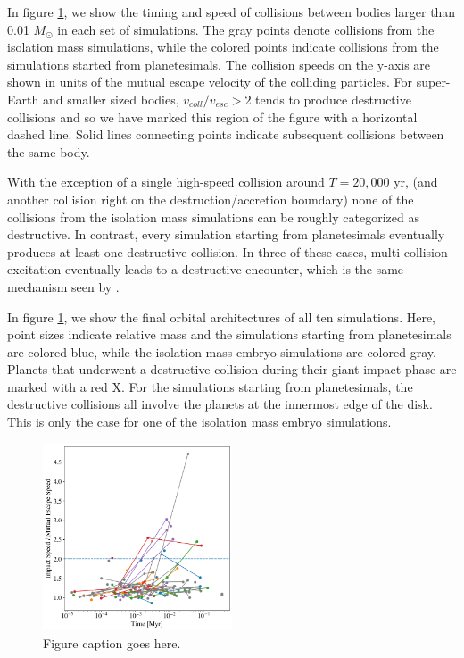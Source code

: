 In figure \ref{fig:impact_iso_comp}, we show the timing and speed of collisions between bodies larger than 0.01 $M_{\odot}$ in each set of simulations. The gray points denote collisions from the isolation mass simulations, while the colored points indicate collisions from the simulations started from planetesimals. The collision speeds on the y-axis are shown in units of the mutual escape velocity of the colliding particles. For super-Earth and smaller sized bodies, $v_{coll}/v_{esc} > 2$ tends to produce destructive collisions \cite{marcus09} and so we have marked this region of the figure with a horizontal dashed line. Solid lines connecting points indicate subsequent collisions between the same body.

With the exception of a single high-speed collision around $T = 20,000$ yr, (and another collision right on the destruction/accretion boundary) none of the collisions from the isolation mass simulations can be roughly categorized as destructive. In contrast, every simulation starting from planetesimals eventually produces at least one destructive collision. In three of these cases, multi-collision excitation eventually leads to a destructive encounter, which is the same mechanism seen by \cite{volk15}.

In figure \ref{fig:impact_iso_comp}, we show the final orbital architectures of all ten simulations. Here, point sizes indicate relative mass and the simulations starting from planetesimals are colored blue, while the isolation mass embryo simulations are colored gray. Planets that underwent a destructive collision during their giant impact phase are marked with a red X. For the simulations starting from planetesimals, the destructive collisions all involve the planets at the innermost edge of the disk. This is only the case for one of the isolation mass embryo simulations. 

\begin{figure}
\begin{center}
    \includegraphics[width=0.5\textwidth]{figures/stip/impact_iso_comp.png}
    \caption{Figure caption goes here.\label{fig:impact_iso_comp}}
\end{center}
\end{figure}

